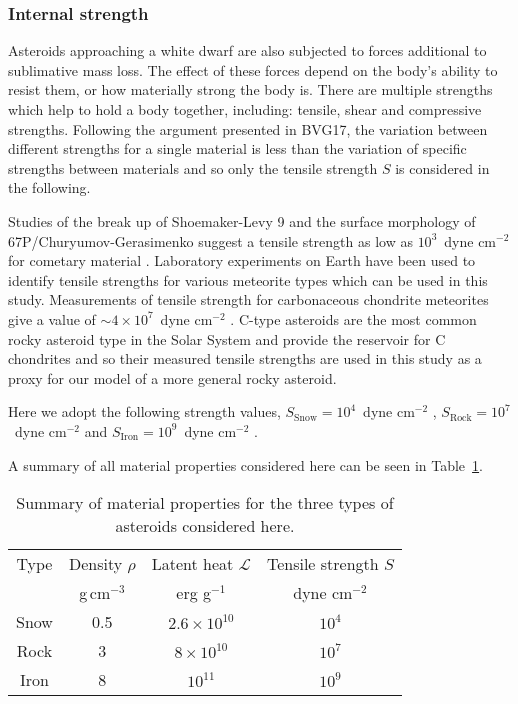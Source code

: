 \documentclass[fleqn,usenatbib]{mnras}
\newcommand{\gcm}{g\,cm$^{-3}$ }	%
\newcommand{\ergg}{erg g$^{-1}$ } %
\newcommand{\dynecm}{dyne cm$^{-2}$ } %
\begin{document}
\subsubsection{Internal strength} \label{subsubsec:ast_strength}
Asteroids approaching a white dwarf are also subjected to forces additional to sublimative mass loss. 
The effect of these forces depend on the body's ability to resist them, or how materially strong the body is. 
There are multiple strengths which help to hold a body together, including: tensile, shear and compressive strengths. 
Following the argument presented in BVG17, the variation between different strengths for a single material is less than the variation of specific strengths between materials and so only the tensile strength $S$ is considered in the following. 

Studies of the break up of Shoemaker-Levy 9 and the surface morphology of 67P/Churyumov-Gerasimenko suggest a tensile strength as low as $10^3$~\dynecm  for cometary material \citep{Greenberg1995, Groussin2015}. 
Laboratory experiments on Earth have been used to identify tensile strengths for various meteorite types which can be used in this study. 
Measurements of tensile strength for carbonaceous chondrite meteorites give a value of $\sim 4 \times 10^{7}$~\dynecm \citep{Pohl2020}.
C-type asteroids are the most common rocky asteroid type in the Solar System and provide the reservoir for C chondrites and so their measured tensile strengths are used in this study as a proxy for our model of a more general rocky asteroid. 

Here we adopt the following strength values, $S_\text{Snow} = 10^4$~\dynecm, $S_\text{Rock} = 10^{7}$~\dynecm and $S_\text{Iron} = 10^{9}$~\dynecm.

A summary of all material properties considered here can be seen in Table~\ref{tab:props}.

\begin{table}
	\centering
	\caption{Summary of material properties for the three types of asteroids considered here.}
	\label{tab:props}
	\begin{tabular}{cccc} %
		\hline
		 Type & Density $\rho$ & Latent heat $\mathcal{L}$ & Tensile strength $S$\\
		 & \gcm & \ergg & \dynecm \\
		\hline
		Snow & 0.5 & $2.6 \times 10^{10}$ & $10^4$ \\
		Rock & 3 & $8 \times 10^{10}$ & $10^7$ \\
		Iron & 8 & $10^{11}$ & $10^9$ \\
		\hline
	\end{tabular}
\end{table}
\end{document}
